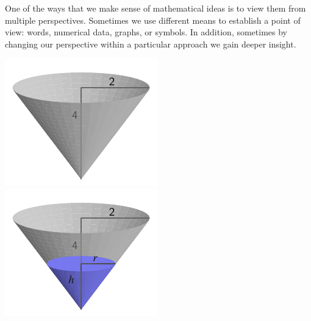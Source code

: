 \documentclass{ximera}
\begin{document}
One of the ways that we make sense of mathematical ideas is to view them from multiple perspectives.  Sometimes we use different means to establish a point of view:  words, numerical data, graphs, or symbols.  In addition, sometimes by changing our perspective within a particular approach we gain deeper insight.%

\begin{image}
\includegraphics{tandem-empty-conical-tank.pdf}
\includegraphics{tandem-filled-conical-tank.pdf}
\end{image}
\end{document}
